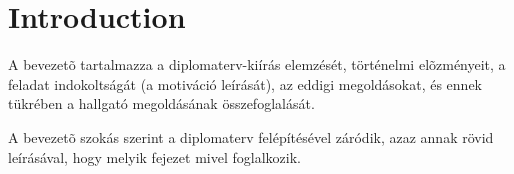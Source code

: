 \chapter*{Introduction}

A bevezetõ tartalmazza a diplomaterv-kiírás elemzését, történelmi elõzményeit, a feladat indokoltságát (a motiváció leírását), az eddigi megoldásokat, és ennek tükrében a hallgató megoldásának összefoglalását.

A bevezetõ szokás szerint a diplomaterv felépítésével záródik, azaz annak rövid leírásával, hogy melyik fejezet mivel foglalkozik.

